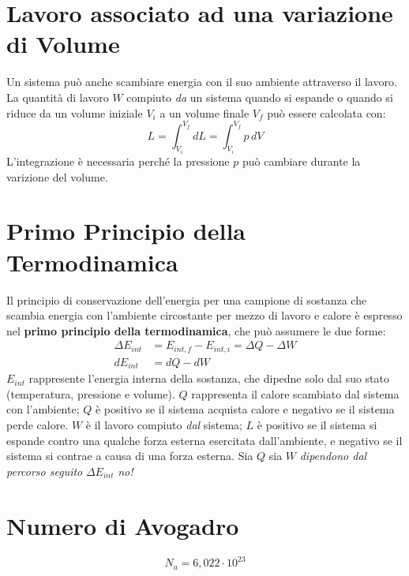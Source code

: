     \section{Lavoro associato ad una variazione di Volume} Un sistema può anche
    scambiare energia con il suo ambiente attraverso il lavoro. La quantità di 
    lavoro $W$ compiuto \textit{da} un sistema quando si espande o quando si 
    riduce da un volume iniziale $V_i$ a un volume finale $V_f$ può essere 
    calcolata con:
        \begin{equation}
            L = \int_{V_i}^{V_f} dL =  \int_{V_i}^{V_f} p \,dV  
        \end{equation}
    L'integrazione è necessaria perché la pressione $p$ può cambiare durante la
    varizione del volume.

    \section{Primo Principio della Termodinamica} Il principio di conservazione
    dell'energia per una campione di sostanza che scambia energia con 
    l'ambiente circostante per mezzo di lavoro e calore è espresso nel \textbf{
    primo principio della termodinamica}, che può assumere le due forme:
        \begin{align}
            \Delta E_{int} &= E_{int, f} - E_{int, i} = \Delta Q - \Delta W \\
            d E_{int} &= d Q - d W
        \end{align}
    $E_{int}$ rappresente l'energia interna della sostanza, che dipedne solo 
    dal suo stato (temperatura, pressione e volume). $Q$ rappresenta il calore
    scambiato dal sistema con l'ambiente; $Q$ è positivo se il sistema acquista
    calore e negativo se il sistema perde calore. $W$ è il lavoro compiuto
    \textit{dal} sistema; $L$ è positivo se il sistema si espande contro una 
    qualche forza esterna esercitata dall'ambiente, e negativo se il sistema si
    contrae a causa di una forza esterna. Sia $Q$ sia $W$ \textit{dipendono dal
    percorso seguito} $\Delta E_{int}$ \textit{no!}



    \section{Numero di Avogadro}
        \begin{equation*}
            N_a = 6,022 \cdot 10^{23}
        \end{equation*}

